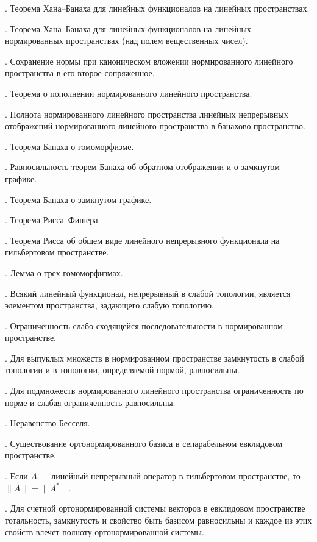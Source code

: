 \documentclass[10pt,titlepage, a4paper]{article}
\begin{document}
. Теорема Хана--Банаха для линейных функционалов на
линейных пространствах.

. Теорема Хана--Банаха для линейных функционалов на
линейных нормированных пространствах (над полем вещественных чисел).

. Сохранение нормы при каноническом вложении
нормированного линейного пространства в его второе сопряженное.

. Теорема о пополнении нормированного линейного
пространства.

. Полнота нормированного линейного пространства линейных
непрерывных отображений нормированного линейного пространства в
банахово пространство.

. Теорема Банаха о гомоморфизме.

. Равносильность теорем Банаха об обратном отображении и
о замкнутом графике.

. Теорема Банаха о замкнутом графике.

. Теорема Рисса--Фишера.

. Теорема Рисса об общем виде линейного непрерывного
функционала на гильбертовом пространстве.

. Лемма о трех гомоморфизмах.

. Всякий линейный функционал, непрерывный в слабой
топологии, является элементом пространства, задающего слабую
топологию.

. Ограниченность слабо сходящейся последовательности в
нормированном пространстве.

. Для выпуклых множеств в нормированном пространстве
замкнутость в слабой топологии и в топологии, определяемой нормой,
равносильны.

. Для подмножеств нормированного линейного пространства
ограниченность по норме и слабая ограниченность равносильны.

. Неравенство Бесселя.

. Существование ортонормированного базиса в
сепарабельном евклидовом пространстве.

. Если $A$ --- линейный непрерывный оператор в
гильбертовом пространстве, то $\|A\|=\|A^*\|$.

. Для счетной ортонормированной системы векторов в
евклидовом пространстве тотальность, замкнутость и свойство быть
базисом равносильны и каждое из этих свойств влечет полноту
ортонормированной системы.
\end{document}
